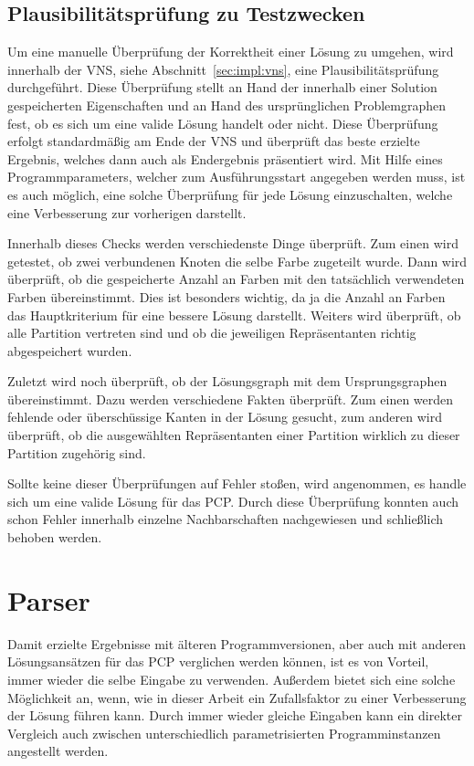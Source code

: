 \subsection{Plausibilitätsprüfung zu Testzwecken}
\label{sec:plausibility}
Um eine manuelle Überprüfung der Korrektheit einer Lösung zu umgehen, wird innerhalb der VNS, siehe Abschnitt~\ref{sec:impl:vns}, eine Plausibilitätsprüfung durchgeführt. Diese Überprüfung stellt an Hand 
der innerhalb einer Solution gespeicherten Eigenschaften und an Hand des ursprünglichen Problemgraphen fest, ob es sich um eine valide Lösung handelt oder nicht. Diese Überprüfung erfolgt standardmäßig
am Ende der VNS und überprüft das beste erzielte Ergebnis, welches dann auch als Endergebnis präsentiert wird. Mit Hilfe eines Programmparameters, welcher zum Ausführungsstart angegeben werden muss, ist es
auch möglich, eine solche Überprüfung für jede Lösung einzuschalten, welche eine Verbesserung zur vorherigen darstellt. 

Innerhalb dieses Checks werden verschiedenste Dinge überprüft. Zum einen wird getestet, ob zwei verbundenen Knoten die selbe Farbe zugeteilt wurde. Dann wird überprüft, ob die gespeicherte Anzahl an Farben
mit den tatsächlich verwendeten Farben übereinstimmt. Dies ist besonders wichtig, da ja die Anzahl an Farben das Hauptkriterium für eine bessere Lösung darstellt. Weiters wird überprüft, ob alle Partition
vertreten sind und ob die jeweiligen Repräsentanten richtig abgespeichert wurden. 

Zuletzt wird noch überprüft, ob der Lösungsgraph mit dem Ursprungsgraphen übereinstimmt. Dazu werden verschiedene Fakten überprüft. Zum einen werden fehlende oder überschüssige Kanten in der Lösung gesucht, 
zum anderen wird überprüft, ob die ausgewählten Repräsentanten einer Partition wirklich zu dieser Partition zugehörig sind. 

Sollte keine dieser Überprüfungen auf Fehler stoßen, wird angenommen, es handle sich um eine valide Lösung für das PCP. Durch diese Überprüfung konnten auch schon Fehler innerhalb einzelne Nachbarschaften 
nachgewiesen und schließlich behoben werden.


\section{Parser}
\label{sec:parser}

Damit erzielte Ergebnisse mit älteren Programmversionen, aber auch mit anderen Lösungs\-ansätzen für das PCP verglichen werden können, ist es von
Vorteil, immer wieder die selbe Eingabe zu verwenden. Außerdem bietet sich eine solche Möglichkeit an, wenn, wie in dieser Arbeit ein Zufallsfaktor
zu einer Verbesserung der Lösung führen kann. Durch immer wieder gleiche Eingaben kann ein direkter Vergleich auch zwischen unterschiedlich
parametrisierten Programminstanzen angestellt werden.

